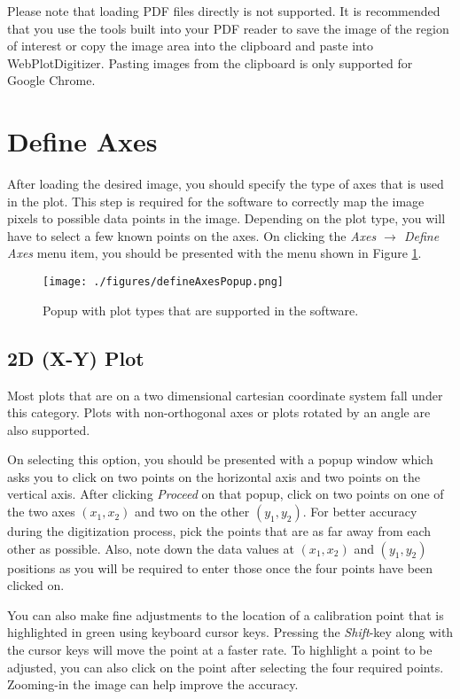 \documentclass[letterpaper, 10pt]{article}
\begin{document}
Please note that loading PDF files directly is not supported. It is recommended that you use the tools built into your PDF reader to save the image of the region of interest or copy the image area into the clipboard and paste into WebPlotDigitizer. Pasting images from the clipboard is only supported for Google Chrome.


\section{Define Axes}

After loading the desired image, you should specify the type of axes that is used in the plot. This step is required for the software to correctly map the image pixels to possible data points in the image. Depending on the plot type, you will have to select a few known points on the axes. On clicking the \emph{Axes $\rightarrow$ Define Axes} menu item, you should be presented with the menu shown in Figure \ref{fig:defineAxesPopup}.
\begin{figure}
\begin{center}
\texttt{[image: ./figures/defineAxesPopup.png]}
\caption{Popup with plot types that are supported in the software.}
\label{fig:defineAxesPopup}
\end{center}
\end{figure}

\subsection{2D (X-Y) Plot}
Most plots that are on a two dimensional cartesian coordinate system fall under this category. Plots with non-orthogonal axes or plots rotated by an angle are also supported.

On selecting this option, you should be presented with a popup window which asks you to click on two points on the horizontal axis and two points on the vertical axis. After clicking \emph{Proceed} on that popup, click on two points on one of the two axes $(x_1, x_2)$ and two on the other $(y_1, y_2)$. For better accuracy during the digitization process, pick the points that are as far away from each other as possible. Also, note down the data values at $(x_1, x_2)$ and $(y_1, y_2)$ positions as you will be required to enter those once the four points have been clicked on. 

You can also make fine adjustments to the location of a calibration point that is highlighted in green using keyboard cursor keys. Pressing the \emph{Shift}-key along with the cursor keys will move the point at a faster rate. To highlight a point to be adjusted, you can also click on the point after selecting the four required points. Zooming-in the image can help improve the accuracy.
\end{document}
